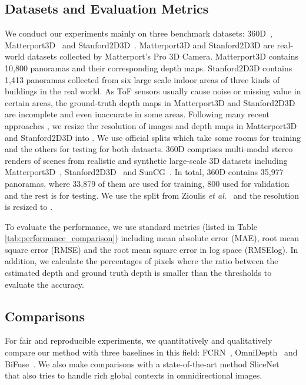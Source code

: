 \documentclass[10pt,twocolumn,letterpaper]{article}
\begin{document}
\subsection{Datasets and Evaluation Metrics}
We conduct our experiments mainly on three benchmark datasets: 360D~\cite{3D60}, Matterport3D~\cite{Matterport3D} and Stanford2D3D~\cite{Stanford3D}. 
Matterport3D and Stanford2D3D are real-world datasets collected by Matterport’s Pro 3D Camera. Matterport3D contains 10,800 panoramas and their corresponding depth maps. Stanford2D3D contains 1,413 panoramas collected from six large scale indoor areas of three kinds of buildings in the real world. As ToF sensors usually cause noise or missing value in certain areas, the ground-truth depth maps in Matterport3D and Stanford2D3D are incomplete and even inaccurate in some areas. Following many recent approaches \cite{9157424,Pintore_2021_CVPR}, we resize the resolution of images and depth maps in Matterport3D and Stanford2D3D into . We use official splits which take some rooms for training and the others for testing for both datasets. 360D comprises multi-modal stereo renders of scenes from realistic and synthetic large-scale 3D datasets including Matterport3D~\cite{Matterport3D}, Stanford2D3D~\cite{Stanford3D} and SunCG~\cite{SunCG}. 
In total, 360D contains 35,977 panoramas, where 33,879 of them are used for training, 800 used for validation and the rest is for testing. We use the split from Zioulis \emph{et al.}~\cite{3D60} and the resolution is resized to .

To evaluate the performance, we use standard metrics (listed in Table \ref{tab:performance_comparison}) including mean absolute error (MAE), root mean square error (RMSE) and the root mean square error in log space (RMSElog). 
In addition, we calculate the percentages of pixels where the ratio between the estimated depth and ground truth depth is smaller than the thresholds  to evaluate the accuracy.

\subsection{Comparisons}

For fair and reproducible experiments, we quantitatively and qualitatively compare our method with three baselines in this field: FCRN~\cite{Laina_2016_3DV}, OmniDepth~\cite{3D60} and BiFuse~\cite{9157424}. We also make comparisons with a state-of-the-art method SliceNet~\cite{Pintore_2021_CVPR} that also tries to handle rich global contexts in omnidirectional images. 
\end{document}
